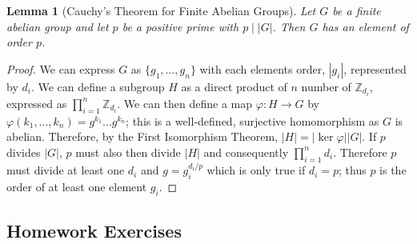 \documentclass[12pt]{article}
\newcommand{\Z}{\mathbb{Z}}
\newtheorem{lma}{Lemma}
\numberwithin{problem}{section} %
\numberwithin{defn}{section} %
\numberwithin{thm}{section} %
\numberwithin{exer}{section} %
\numberwithin{lma}{section} %
\numberwithin{crlly}{section} %
\theoremstyle{remark}  %
\begin{document}
\setcounter{lma}{38}
\begin{lma}[Cauchy's Theorem for Finite Abelian Groups]
    Let $G$ be a finite abelian group and let $p$ be a positive prime with $p\mid |G|$. Then $G$ has an element of order $p$.
\end{lma}
\begin{proof}
    We can express $G$ as $\{g_1,\dots,g_n\}$ with each elements order, $|g_i|$, represented by $d_i$. We can define a subgroup $H$ as a direct product of $n$ number of $\Z_{d_i}$, expressed as $\prod_{i=1}^{n}\Z_{d_i}$. We can then define a map $\varphi\operatorname{:}H\to G$ by $\varphi(k_1,\dots,k_n)=g^{k_1}\dots g^{k_n}$; this is a well-defined, surjective homomorphism as $G$ is abelian. Therefore, by the First Isomorphism Theorem, $|H|=|\ker\varphi||G|$. If $p$ divides $|G|$, $p$ must also then divide $|H|$ and consequently $\prod^{n}_{i=1}d_i$. Therefore $p$ must divide at least one $d_i$ and $g=g_i^{d_i/p}$ which is only true if $d_i=p$; thus $p$ is the order of at least one element $g_i$.
\end{proof}

\subsection{Homework Exercises}
\end{document}
